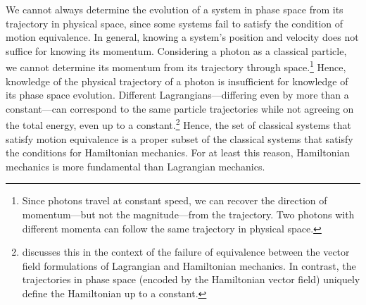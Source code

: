 \documentclass[letterpaper]{article}
\begin{document}
We cannot always determine the evolution of a system in phase space from its trajectory in physical space, since some systems fail to satisfy the condition of motion equivalence. In general, knowing a system's position and velocity does not suffice for knowing its momentum. Considering a photon as a classical particle, we cannot determine its momentum from its trajectory through space.\footnote{Since photons travel at constant speed, we can recover the direction of momentum---but not the magnitude---from the trajectory. Two photons with different momenta can follow the same trajectory in physical space.} Hence, knowledge of the physical trajectory of a photon is insufficient for knowledge of its phase space evolution. Different Lagrangians---differing even by more than a constant---can correspond to the same particle trajectories while not agreeing on the total energy, even up to a constant.\footnote{\textcites[1185--1186]{Barrett2} discusses this in the context of the failure of equivalence between the vector field formulations of Lagrangian and Hamiltonian mechanics. In contrast, the trajectories in phase space (encoded by the Hamiltonian vector field) uniquely define the Hamiltonian up to a constant.} Hence, the set of classical systems that satisfy motion equivalence is a proper subset of the classical systems that satisfy the conditions for Hamiltonian mechanics. For at least this reason, Hamiltonian mechanics is more fundamental than Lagrangian mechanics.
\end{document}
